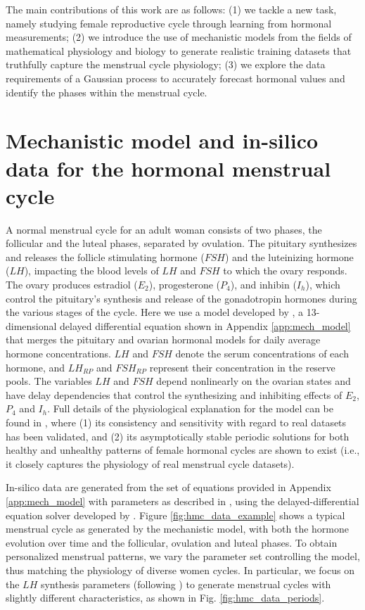 \documentclass{article}
\newcommand{\ie}{i.e., }
\begin{document}
The main contributions of this work are as follows: (1) we tackle a new task, namely studying female reproductive cycle through learning from hormonal measurements; (2) we introduce the use of mechanistic models from the fields of mathematical physiology and biology to generate realistic training datasets that truthfully capture the menstrual cycle physiology; (3) we explore the data requirements of a Gaussian process to accurately forecast hormonal values and identify the phases within the menstrual cycle.

\section{Mechanistic model and in-silico data for the hormonal menstrual cycle}
\label{sec:hmc_model}

A normal menstrual cycle for an adult woman consists of two phases, the follicular and the luteal phases, separated by ovulation. The pituitary synthesizes and releases the follicle stimulating hormone ($FSH$) and the luteinizing hormone ($LH$), impacting the blood levels of $LH$ and $FSH$ to which the ovary responds. The ovary produces estradiol ($E_2$), progesterone ($P_4$), and inhibin ($I_h$), which control the pituitary’s synthesis and release of the gonadotropin hormones during the various stages of the cycle. Here we use a model developed by \citet{j-Clark2003}, a 13-dimensional delayed differential equation shown in Appendix \ref{app:mech_model} that merges the pituitary \citep{j-Schlosser2000} and ovarian \citep{j-Selgrade1999} hormonal models for daily average hormone concentrations. $LH$ and $FSH$ denote the serum concentrations of each hormone, and $LH_{RP}$ and $FSH_{RP}$ represent their concentration in the reserve pools. The variables $LH$ and $FSH$ depend nonlinearly on the ovarian states and have delay dependencies that control the synthesizing and inhibiting effects of $E_2$, $P_4$ and $I_h$. Full details of the physiological explanation for the model can be found in \citep{j-Clark2003,j-Selgrade2009}, where (1) its consistency and sensitivity with regard to real datasets has been validated, and (2) its asymptotically stable periodic solutions for both healthy and unhealthy patterns of female hormonal cycles are shown to exist (\ie it closely captures the physiology of real menstrual cycle datasets). 

In-silico data are generated from the set of equations provided in Appendix \ref{app:mech_model} with parameters as described in \citet{j-Clark2003}, using the delayed-differential equation solver developed by \citet{j-Shampine2001}. Figure \ref{fig:hmc_data_example} shows a typical menstrual cycle as generated by the mechanistic model, with both the hormone evolution over time and the follicular, ovulation and luteal phases. To obtain personalized menstrual patterns, we vary the parameter set controlling the model, thus matching the physiology of diverse women cycles. In particular, we focus on the $LH$ synthesis parameters (following \citet{j-Selgrade2009}) to generate menstrual cycles with slightly different characteristics, as shown in Fig. \ref{fig:hmc_data_periods}.
\end{document}
